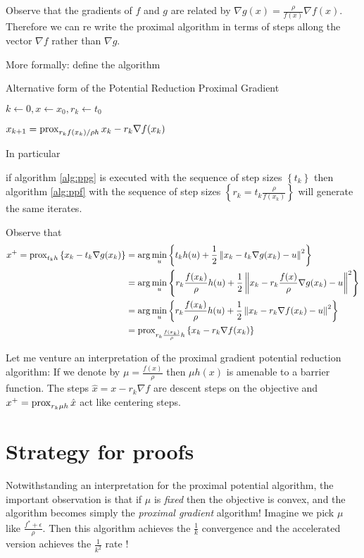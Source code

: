 \documentclass[smallextended]{article}       %
\begin{document}
Observe that the gradients of $f$ and $g$ are related by $\nabla g(x) = \frac{\rho}{f(x)}\nabla f(x)$.
Therefore we can re write the proximal algorithm in terms of steps allong the vector
$\nabla f$ rather than $\nabla g$. 

More formally: define the algorithm
\begin{algorithm}
  \caption{Alternative form of the Potential Reduction Proximal Gradient}
  \begin{algorithmic}
  \STATE $k \gets 0, x \gets x_0, r_k \gets t_0$

    \STATE $x_{k+1} = \operatorname{prox}_{r_kf(x_k)/\rho h}{x_k - r_k \nabla f(x_k)}$
  \ENDWHILE
  \end{algorithmic}
  \label{alg:ppf}
\end{algorithm}

In particular 
\begin{clm}
if algorithm \eqref{alg:ppg} is executed with the sequence of 
step sizes $\left\{ t_k \right\}$ then algorithm \eqref{alg:ppf} with 
the sequence of step sizes $\left\{ r_k = t_k \frac{\rho}{f(x_k)}\right\}$ will generate the same iterates.

\end{clm}
\begin{prf}
 Observe that 
 \begin{align*}
   x^+ = \operatorname{prox}_{t_kh}\left\{x_k - t_k \nabla g(x_k)\right\} & = \arg \min_u \left\{ t_kh(u) + \frac{1}{2}\left\| x_k - t_k \nabla g(x_k)-u \right\|^2 \right\} \\
   & = \arg \min_u \left\{ r_k\frac{f(x_k)}{\rho}h(u) + \frac{1}{2}\left\| x_k - r_k\frac{f(x)}{\rho} \nabla g(x_k)-u \right\|^2 \right\} \\
   & = \arg \min_u \left\{ r_k\frac{f(x_k)}{\rho}h(u) + \frac{1}{2}\left\| x_k - r_k\nabla f(x_k)-u \right\|^2 \right\} \\
   & = \operatorname{prox}_{r_k\frac{f(x_k)}{\rho}h}\left\{x_k - r_k\nabla f(x_k)\right\}
 \end{align*} 
 \end{prf} 

 Let me venture an interpretation of the proximal gradient potential reduction algorithm:
 If we denote by $\mu = \frac{f(x)}{\rho}$ then $\mu h(x)$ is amenable to a barrier function. 
 The steps $\hat x = x - r_k\nabla f$ are descent steps on the objective and $x^+ = \operatorname{prox}_{r_k \mu h}{\hat x}$ act
 like centering steps.


 \section{Strategy for proofs}
 Notwithstanding an interpretation for the proximal potential algorithm,
 the important observation is that if $\mu$ is {\em fixed} then the
 objective is convex, and the algorithm becomes simply the {\em proximal gradient}
 algorithm! Imagine we pick $\mu$ like $\frac{f^*+\epsilon}{\rho}$.  Then this
 algorithm achieves the $\frac{1}{k}$ convergence and the accelerated version
 achieves the $\frac{1}{k^2}$ rate !
\end{document}
